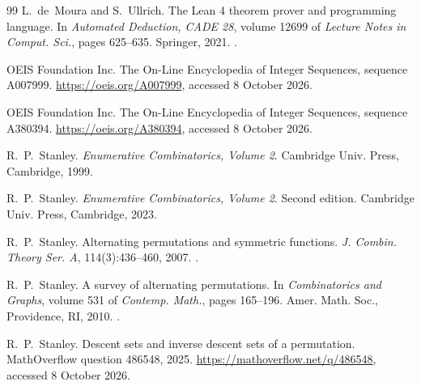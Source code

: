 \documentclass[12pt]{article}
\numberwithin{theorem}{section}
\numberwithin{equation}{section}
\begin{document}
\begin{thebibliography}{99}
 L.~de~Moura and S.~Ullrich.
The Lean 4 theorem prover and programming language.
In \emph{Automated Deduction, CADE 28}, volume 12699 of \emph{Lecture Notes in Comput. Sci.}, pages
625--635. Springer, 2021. .

 OEIS Foundation Inc.
The On-Line Encyclopedia of Integer Sequences, sequence A007999. \url{https://oeis.org/A007999}, accessed 8 October 2026.

 OEIS Foundation Inc.
The On-Line Encyclopedia of Integer Sequences, sequence A380394. \url{https://oeis.org/A380394}, accessed 8 October 2026.

 R.~P.~Stanley.
\emph{Enumerative Combinatorics, Volume 2}.
Cambridge Univ. Press, Cambridge, 1999.

 R.~P.~Stanley.
\emph{Enumerative Combinatorics, Volume 2}. Second edition.
Cambridge Univ. Press, Cambridge, 2023.

 R.~P.~Stanley.
Alternating permutations and symmetric functions.
\emph{J. Combin. Theory Ser. A}, 114(3):436--460, 2007. .

 R.~P.~Stanley.
A survey of alternating permutations.
In \emph{Combinatorics and Graphs}, volume 531 of \emph{Contemp. Math.}, pages 165--196.
Amer. Math. Soc., Providence, RI, 2010. .

 R.~P.~Stanley.
Descent sets and inverse descent sets of a permutation.
MathOverflow question 486548, 2025. \url{https://mathoverflow.net/q/486548}, accessed 8 October 2026.

\end{thebibliography}
\end{document}
